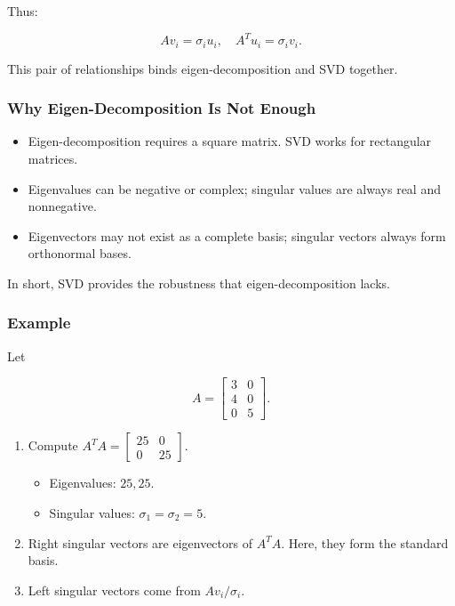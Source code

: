 \documentclass[
  letterpaper,
  DIV=11,
  numbers=noendperiod]{scrreprt}
\providecommand{\tightlist}{%
  \setlength{\itemsep}{0pt}\setlength{\parskip}{0pt}}
\begin{document}
Thus:

\[
Av_i = \sigma_i u_i, \quad A^T u_i = \sigma_i v_i.
\]

This pair of relationships binds eigen-decomposition and SVD together.

\subsubsection{Why Eigen-Decomposition Is Not
Enough}\label{why-eigen-decomposition-is-not-enough}

\begin{itemize}
\tightlist
\item
  Eigen-decomposition requires a square matrix. SVD works for
  rectangular matrices.
\item
  Eigenvalues can be negative or complex; singular values are always
  real and nonnegative.
\item
  Eigenvectors may not exist as a complete basis; singular vectors
  always form orthonormal bases.
\end{itemize}

In short, SVD provides the robustness that eigen-decomposition lacks.

\subsubsection{Example}\label{example-4}

Let

\[
A = \begin{bmatrix}3 & 0 \\ 4 & 0 \\ 0 & 5\end{bmatrix}.
\]

\begin{enumerate}
\def\labelenumi{\arabic{enumi}.}
\item
  Compute \(A^T A = \begin{bmatrix}25 & 0 \\ 0 & 25\end{bmatrix}\).

  \begin{itemize}
  \tightlist
  \item
    Eigenvalues: \(25, 25\).
  \item
    Singular values: \(\sigma_1 = \sigma_2 = 5\).
  \end{itemize}
\item
  Right singular vectors are eigenvectors of \(A^T A\). Here, they form
  the standard basis.
\item
  Left singular vectors come from \(Av_i / \sigma_i\).
\end{enumerate}
\end{document}
